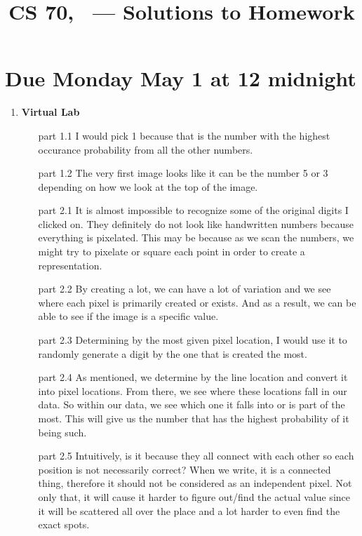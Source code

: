 \documentclass[12pt,fleqn]{article}
\title{CS 70, \Session\ --- Solutions to Homework \Homework}
\date{}
\begin{document}
\maketitle

\section*{Due Monday May 1 at 12 midnight}



\begin{enumerate}
  \item \textbf{Virtual Lab}
	\begin{enumerate}
  		\item[part 1.1] I would pick 1 because that is the number with the highest occurance probability from all the other numbers.
  		\item[part 1.2] The very first image looks like it can be the number 5 or 3 depending on how we look at the top of the image. 
  		\item[part 2.1] It is almost impossible to recognize some of the original digits I clicked on. They definitely do not look like handwritten numbers because everything is pixelated. This may be because as we scan the numbers, we might try to pixelate or square each point in order to create a representation. 
  		\item[part 2.2] By creating a lot, we can have a lot of variation and we see where each pixel is primarily created or exists. And as a result, we can be able to see if the image is a specific value. 
  		\item[part 2.3] Determining by the most given pixel location, I would use it to randomly generate a digit by the one that is created the most.
  		\item[part 2.4] As mentioned, we determine by the line location and convert it into pixel locations. From there, we see where these locations fall in our data. So within our data, we see which one it falls into or is part of the most. This will give us the number that has the highest probability of it being such.
  		\item[part 2.5] Intuitively, is it because they all connect with each other so each position is not necessarily correct? When we write, it is a connected thing, therefore it should not be considered as an independent pixel. Not only that, it will cause it harder to figure out/find the actual value since it will be scattered all over the place and a lot harder to even find the exact spots. 

\end{enumerate}
\end{enumerate}
\end{document}
